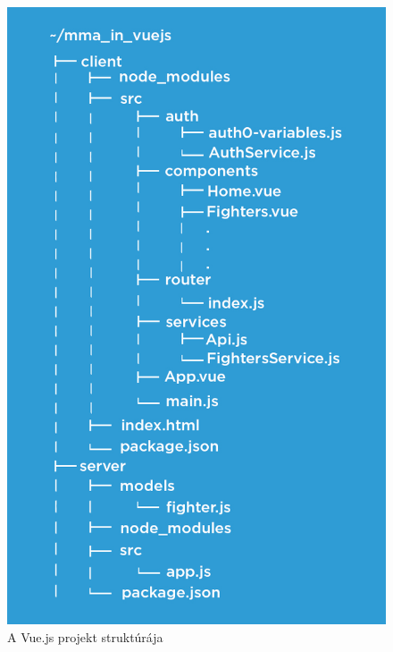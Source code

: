 \begin{figure}[htb]
\centering
\includegraphics[scale=0.8]{kepek/mma_in_vue.jpeg}
\caption{A Vue.js projekt struktúrája}
\label{fig:vue_structure}
\end{figure}
